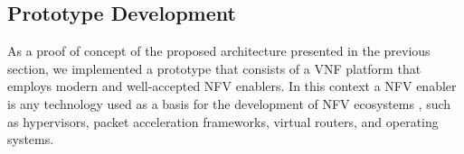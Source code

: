 

\subsection{Prototype Development}\label{PROTO}





As a proof of concept of the proposed architecture presented in the previous section, we implemented a prototype that consists of a VNF platform that employs modern and well-accepted NFV enablers. In this context a NFV enabler is any technology used as a basis for the development of NFV ecosystems \cite{ETSI-2012}, such as hypervisors, packet acceleration frameworks, virtual routers, and operating systems.

